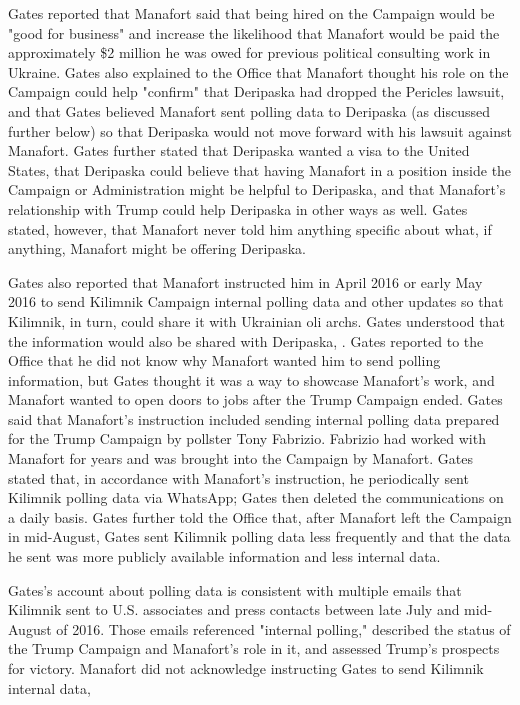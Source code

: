 Gates reported that Manafort said that being hired on the Campaign would be "good for business" and increase the likelihood that Manafort would be paid the approximately \$2 million he was owed for previous political consulting work in Ukraine.%
Gates also explained to the Office that Manafort thought his role on the Campaign could help "confirm" that Deripaska had dropped the Pericles lawsuit, and that Gates believed Manafort sent polling data to Deripaska (as discussed further below) so that Deripaska would not move forward with his lawsuit against Manafort.%
Gates further stated that Deripaska wanted a visa to the United States, that Deripaska could believe that having Manafort in a position inside the Campaign or Administration might be helpful to Deripaska, and that Manafort's relationship with Trump could help Deripaska in other ways as well.%
Gates stated, however, that Manafort never told him anything specific about what, if anything, Manafort might be offering Deripaska.%

Gates also reported that Manafort instructed him in April 2016 or early May 2016 to send Kilimnik Campaign internal polling data and other updates so that Kilimnik, in turn, could share it with Ukrainian oli archs.%
Gates understood that the information would also be shared with Deripaska,
.%
Gates reported to the Office that he did not know why Manafort wanted him to send polling information, but Gates thought it was a way to showcase Manafort's work, and Manafort wanted to open doors to jobs after the Trump Campaign ended.%
Gates said that Manafort's instruction included sending internal polling data prepared for the Trump Campaign by pollster Tony Fabrizio.%
Fabrizio had worked with Manafort for years and was brought into the Campaign by Manafort.
Gates stated that, in accordance with Manafort's instruction, he periodically sent Kilimnik polling data via WhatsApp; Gates then deleted the communications on a daily basis.%
Gates further told the Office that, after Manafort left the Campaign in mid-August, Gates sent Kilimnik polling data less frequently and that the data he sent was more publicly available information and less internal data.%

Gates's account about polling data is consistent
with multiple emails that Kilimnik sent to U.S. associates and press contacts between late July and mid-August of 2016.
Those emails referenced "internal polling," described the status of the Trump Campaign and Manafort's role in it, and assessed Trump's prospects for victory.%
Manafort did not acknowledge instructing Gates to send Kilimnik internal data,

